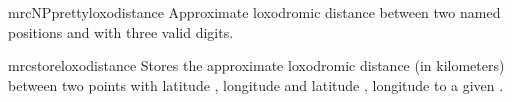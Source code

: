 \begin{docCommand}{mrcNPprettyloxodistance}{}
  Approximate loxodromic distance between two named positions
   and  with three valid digits.
  \begin{dispExample}
  \end{dispExample}
\end{docCommand}

\enlargethispage*{1cm}

\begin{docCommand}{mrcstoreloxodistance}{}
  Stores the approximate loxodromic distance (in kilometers) between two points
  with latitude , longitude 
  and latitude , longitude 
  to a given .
  \begin{dispExample}
  \mrcstoreloxodistance{}
  \mydist
  \end{dispExample}
\end{docCommand}

